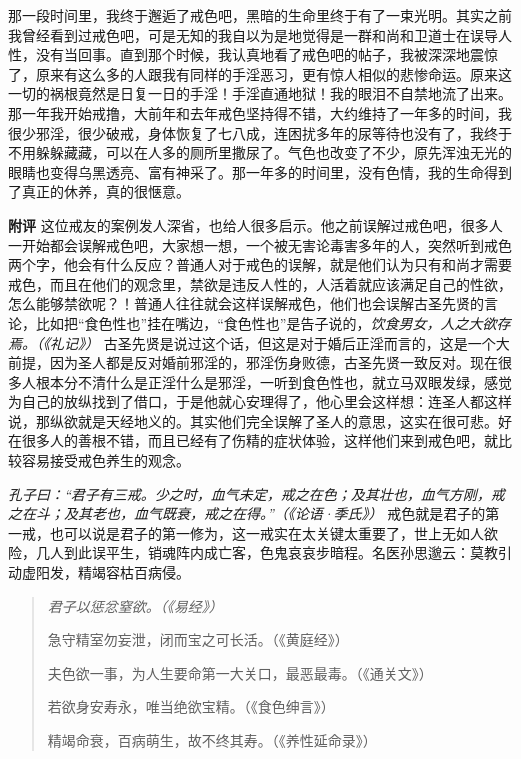 \begin{case}
    那一段时间里，我终于邂逅了戒色吧，黑暗的生命里终于有了一束光明。其实之前我曾经看到过戒色吧，可是无知的我自以为是地觉得是一群和尚和卫道士在误导人性，没有当回事。直到那个时候，我认真地看了戒色吧的帖子，我被深深地震惊了，原来有这么多的人跟我有同样的手淫恶习，更有惊人相似的悲惨命运。原来这一切的祸根竟然是日复一日的手淫！手淫直通地狱！我的眼泪不自禁地流了出来。那一年我开始戒撸，大前年和去年戒色坚持得不错，大约维持了一年多的时间，我很少邪淫，很少破戒，身体恢复了七八成，连困扰多年的尿等待也没有了，我终于不用躲躲藏藏，可以在人多的厕所里撒尿了。气色也改变了不少，原先浑浊无光的眼睛也变得乌黑透亮、富有神采了。那一年多的时间里，没有色情，我的生命得到了真正的休养，真的很惬意。

    \textbf{附评} 这位戒友的案例发人深省，也给人很多启示。他之前误解过戒色吧，很多人一开始都会误解戒色吧，大家想一想，一个被无害论毒害多年的人，突然听到戒色两个字，他会有什么反应？普通人对于戒色的误解，就是他们认为只有和尚才需要戒色，而且在他们的观念里，禁欲是违反人性的，人活着就应该满足自己的性欲，怎么能够禁欲呢？！普通人往往就会这样误解戒色，他们也会误解古圣先贤的言论，比如把“食色性也”挂在嘴边，“食色性也”是告子说的，\textit{饮食男女，人之大欲存焉。（《礼记》）} 古圣先贤是说过这个话，但这是对于婚后正淫而言的，这是一个大前提，因为圣人都是反对婚前邪淫的，邪淫伤身败德，古圣先贤一致反对。现在很多人根本分不清什么是正淫什么是邪淫，一听到食色性也，就立马双眼发绿，感觉为自己的放纵找到了借口，于是他就心安理得了，他心里会这样想：连圣人都这样说，那纵欲就是天经地义的。其实他们完全误解了圣人的意思，这实在很可悲。好在很多人的善根不错，而且已经有了伤精的症状体验，这样他们来到戒色吧，就比较容易接受戒色养生的观念。

    \textit{孔子曰：“君子有三戒。少之时，血气未定，戒之在色；及其壮也，血气方刚，戒之在斗；及其老也，血气既衰，戒之在得。”（《论语·季氏》）} 戒色就是君子的第一戒，也可以说是君子的第一修为，这一戒实在太关键太重要了，世上无如人欲险，几人到此误平生，销魂阵内成亡客，色鬼哀哀步暗程。名医孙思邈云：莫教引动虚阳发，精竭容枯百病侵。

    \begin{quotation}\it
        君子以惩忿窒欲。（《易经》）

        急守精室勿妄泄，闭而宝之可长活。（《黄庭经》）

        夫色欲一事，为人生要命第一大关口，最恶最毒。（《通关文》）

        若欲身安寿永，唯当绝欲宝精。（《食色绅言》）

        精竭命衰，百病萌生，故不终其寿。（《养性延命录》）


\end{quotation}
\end{case}
